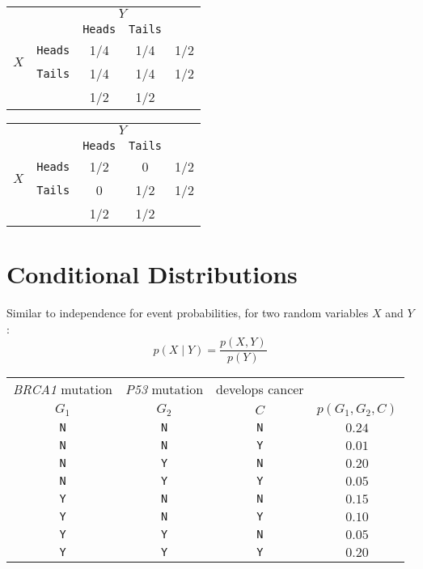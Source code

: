 \begin{center}
\begin{tabular}{cr||c|c|c}
	&& \multicolumn{2}{c|}{$Y$}\\
	&& \texttt{Heads} & \texttt{Tails}\\
\hline\hline
\multirow{2}{*}{$X$} & \texttt{Heads}	& 1/4		& 1/4		& 1/2\\
\cline{3-4}
			& \texttt{Tails}	&	1/4	& 1/4		& 1/2\\
\hline
			&			&	1/2	& 1/2\\
\end{tabular}\hspace{3em}
%
\begin{tabular}{cr||c|c|c}
	&& \multicolumn{2}{c|}{$Y$}\\
	&& \texttt{Heads} & \texttt{Tails}\\
\hline\hline
\multirow{2}{*}{$X$} & \texttt{Heads}	& 1/2		& 0		& 1/2\\
\cline{3-4}
			& \texttt{Tails}	&	0	& 1/2		& 1/2\\
\hline
			&			&	1/2	& 1/2\\
\end{tabular}
\end{center}



\section{Conditional Distributions}
Similar to independence for event probabilities, for two random variables $X$ and $Y$ :
\[p(X\mid Y) = \frac{p(X,Y)}{p(Y)}\]

\begin{center}
\begin{tabular}{c|c|c|c}
\textit{BRCA1} mutation & \textit{P53} mutation & develops cancer \\
$G_1$ & $G_2$ & $C$& $p(G_1,G_2,C)$\\
\hline\hline
\texttt{N}& \texttt{N}& \texttt{N}& $0.24$\\
\texttt{N}& \texttt{N}& \texttt{Y}& $0.01$\\
\texttt{N}& \texttt{Y}& \texttt{N}& $0.20$\\
\texttt{N}& \texttt{Y}& \texttt{Y}& $0.05$\\
\texttt{Y}& \texttt{N}& \texttt{N}& $0.15$\\
\texttt{Y}& \texttt{N}& \texttt{Y}& $0.10$\\
\texttt{Y}& \texttt{Y}& \texttt{N}& $0.05$\\
\texttt{Y}& \texttt{Y}& \texttt{Y}& $0.20$\\
\end{tabular}
\end{center}

